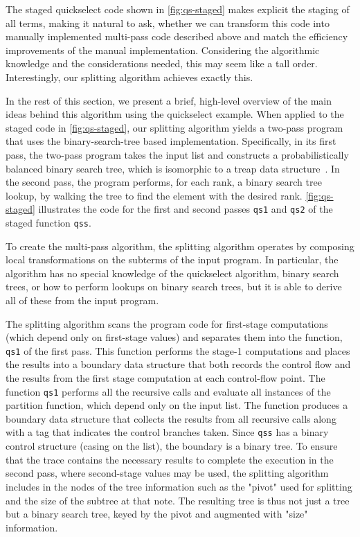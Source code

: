 \begin{abstrsyn}


The staged quickselect code shown in \ref{fig:qs-staged} makes
explicit the staging of all terms, making it natural to ask, whether
we can transform this code into manually implemented multi-pass code
described above and match the efficiency improvements of the manual
implementation. Considering the algorithmic knowledge and the
considerations needed, this may seem like a tall order.
Interestingly, our splitting algorithm achieves exactly this.

In the rest of this section, we present a brief, high-level overview
of the main ideas behind this algorithm using the quickselect example.
%
When applied to the staged code in \ref{fig:qs-staged}, our splitting
algorithm yields a two-pass program that uses the binary-search-tree
based implementation.  Specifically, in its first pass, the two-pass
program takes the input list and constructs a probabilistically
balanced binary search tree, which is isomorphic to a treap data
structure~\cite{treaps}.  In the second pass, the program performs,
for each rank, a binary search tree lookup, by walking the tree to
find the element with the desired rank.
%
\ref{fig:qs-staged} illustrates the code for the first and second
passes \texttt{qs1} and \texttt{qs2} of the staged function
\texttt{qss}.


To create the multi-pass algorithm, the splitting algorithm operates
by composing local transformations on the subterms of the input
program.  In particular, the algorithm has no special knowledge of the
quickselect algorithm, binary search trees, or how to perform lookups
on binary search trees, but it is able to derive all of these from the
input program.
%

The splitting algorithm scans the program code for first-stage
computations (which depend only on first-stage values) and separates
them into the function, \texttt{qs1} of the first pass. This function
performs the stage-1 computations and places the results into a
boundary data structure that both records the control flow and the
results from the first stage computation at each control-flow point.
The function \texttt{qs1} performs all the recursive calls and
evaluate all instances of the partition function, which depend only on
the input list.  The function produces a boundary data structure that
collects the results from all recursive calls along with a tag that
indicates the control branches taken.  Since \texttt{qss} has a binary
control structure (casing on the list), the boundary is a binary tree.
To ensure that the trace contains the necessary results to complete
the execution in the second pass, where second-stage values may be
used, the splitting algorithm includes in the nodes of the tree
information such as the "pivot" used for splitting and the size of the
subtree at that note.  The resulting tree is thus not just a tree but
a binary search tree, keyed by the pivot and augmented with "size"
information.


\end{abstrsyn}
